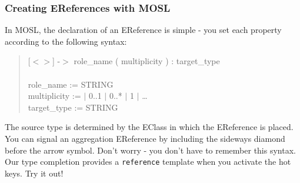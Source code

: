 \newpage
\subsubsection{Creating EReferences with MOSL}
\texHeader
\hypertarget{static:references tex}{}

In MOSL, the declaration of an EReference is simple - you set each property according to the following syntax:

{ \begin{quote} \small
[$<>$] -$>$ role\_name ( multiplicity ) :  target\_type \\
\\
role\_name := STRING \\
multiplicity := $|$ 0..1 $|$ 0..* $|$ 1 $|$ \ldots \\
target\_type := STRING \\
\end{quote} }

The source type is determined by the EClass in which the EReference is placed. You can signal an aggregation EReference by including the sideways diamond before
the arrow symbol. Don't worry - you don't have to remember this syntax. Our type completion provides a \texttt{reference} template when you activate the hot
keys. Try it out!

